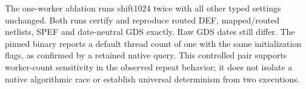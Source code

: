 The one-worker ablation runs shift1024 twice with all other typed settings
unchanged. Both runs certify and reproduce routed DEF, mapped/routed netlists, SPEF
and date-neutral GDS exactly. Raw GDS dates still differ. The pinned binary reports a default thread
count of one with the same initialization flags, as confirmed by a retained
native query. This controlled pair supports worker-count
sensitivity in the observed repeat behavior; it does not isolate a native
algorithmic race or establish universal determinism from two executions.
